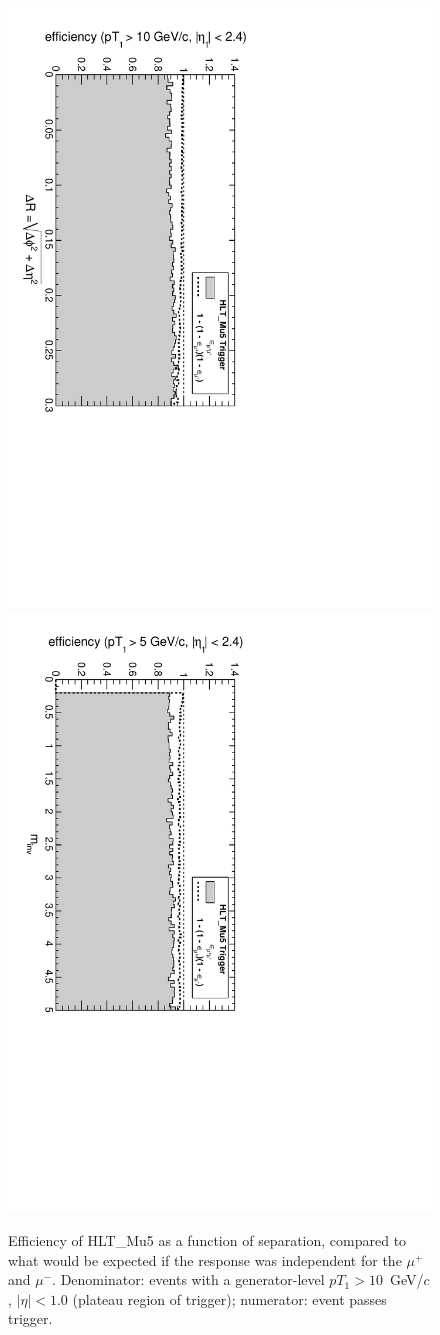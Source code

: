 \documentclass[12pt]{article}
\begin{document}
\begin{figure}[p]
\includegraphics[height=0.5\linewidth, angle=90]{fig/acceptance6_plot/vsdR_HLT_Mu5.pdf}
\includegraphics[height=0.5\linewidth, angle=90]{fig/acceptance6_plot/vsmass_HLT_Mu5.pdf}

\caption{Efficiency of HLT\_Mu5 as a function of separation, compared to what would be expected if the response was independent for the $\mu^+$ and $\mu^-$.  Denominator: events with a
  generator-level $pT_1 > 10$~GeV/$c$, $|\eta| < 1.0$ (plateau region
  of trigger); numerator: event passes trigger. \label{fig:vsseparation_HLT_Mu5}}
\end{figure}
\end{document}

